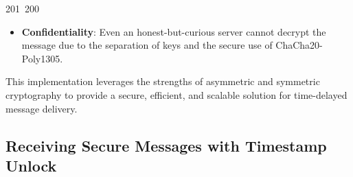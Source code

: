 201~200~\documentclass{article}
\begin{document}
\begin{itemize}
	                                                                                                                                                                                                                                                                                                	                                                                                \item \textbf{Confidentiality}: Even an honest-but-curious server cannot decrypt the message due to the separation of keys and the secure use of ChaCha20-Poly1305.
	                                                                                                                                                                                                                                                                                                	                                                                                \end{itemize}

	                                                                                                                                                                                                                                                                                                	                                                                                This implementation leverages the strengths of asymmetric and symmetric cryptography to provide a secure, efficient, and scalable solution for time-delayed message delivery.

	                                                                                                                                                                                                                                                                                                	                                                                                \subsection{Receiving Secure Messages with Timestamp Unlock}
\end{document}
